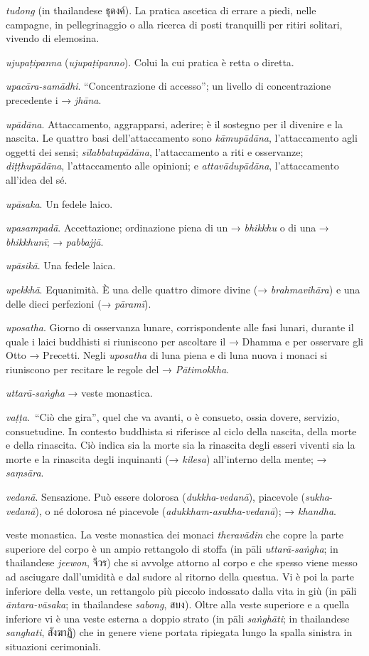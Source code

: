 \emph{tudong} (in thailandese ธุดงค์). La pratica ascetica di errare a
piedi, nelle campagne, in pellegrinaggio o alla ricerca di posti
tranquilli per ritiri solitari, vivendo di elemosina.

\emph{ujupaṭipanna} (\emph{ujupaṭipanno}). Colui la cui pratica è retta
o diretta.

\emph{upacāra-samādhi}. ``Concentrazione di accesso''; un livello di
concentrazione precedente i → \emph{jhāna}.

\emph{upādāna}. Attaccamento, aggrapparsi, aderire; è il sostegno per il
divenire e la nascita. Le quattro basi dell'attaccamento sono
\emph{kāmupādāna}, l'attaccamento agli oggetti dei sensi;
\emph{sīlabbatupādāna}, l'attaccamento a riti e osservanze;
\emph{diṭṭhupādāna}, l'attaccamento alle opinioni; e
\emph{attavādupādāna}, l'attaccamento all'idea del sé.

\emph{upāsaka}. Un fedele laico.

\emph{upasampadā}. Accettazione; ordinazione piena di un →
\emph{bhikkhu} o di una → \emph{bhikkhunī}; → \emph{pabbajjā}.

\emph{upāsikā}. Una fedele laica.

\emph{upekkhā}. Equanimità. È una delle quattro dimore divine (→
\emph{brahmavihāra}) e una delle dieci perfezioni (→ \emph{pāramī}).

\emph{uposatha}. Giorno di osservanza lunare, corrispondente alle fasi
lunari, durante il quale i laici buddhisti si riuniscono per ascoltare
il → Dhamma e per osservare gli Otto → Precetti. Negli \emph{uposatha}
di luna piena e di luna nuova i monaci si riuniscono per recitare le
regole del → \emph{Pātimokkha}.

\emph{uttarā-saṅgha} → veste monastica.

\emph{vaṭṭa}.~``Ciò che gira'', quel che va avanti, o è consueto, ossia
dovere, servizio, consuetudine. In contesto buddhista si riferisce al
ciclo della nascita, della morte e della rinascita. Ciò indica sia la
morte sia la rinascita degli esseri viventi sia la morte e la rinascita
degli inquinanti (→ \emph{kilesa}) all'interno della mente; →
\emph{saṃsāra}.

\emph{vedanā}. Sensazione. Può essere dolorosa
(\emph{dukkha}-\emph{vedanā}), piacevole (\emph{sukha}-\emph{vedanā}), o
né dolorosa né piacevole (\emph{adukkham-asukha-vedanā}); →
\emph{khandha}.

veste monastica. La veste monastica dei monaci \emph{theravādin} che
copre la parte superiore del corpo è un ampio rettangolo di stoffa (in
pāli \emph{uttarā-saṅgha}; in thailandese \emph{jeewon}, จีวร) che si
avvolge attorno al corpo e che spesso viene messo ad asciugare
dall'umidità e dal sudore al ritorno della questua. Vi è poi la parte
inferiore della veste, un rettangolo più piccolo indossato dalla vita in
giù (in pāli \emph{āntara-vāsaka}; in thailandese \emph{sabong}, สบง).
Oltre alla veste superiore e a quella inferiore vi è una veste esterna a
doppio strato (in pāli \emph{saṅghāti}; in thailandese \emph{sanghati},
สังฆาฏิ) che in genere viene portata ripiegata lungo la spalla sinistra
in situazioni cerimoniali.

